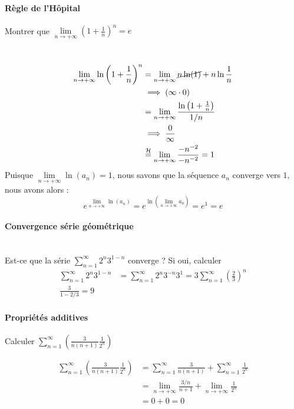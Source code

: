 \documentclass{report}
\begin{document}
\begin{multicols*}{2}
  \paragraph{Règle de l'Hôpital}
  Montrer que $\lim\limits_{n \to+\infty } (1 + \frac{1}{n})^n = e$ 

  \mbox{}\vspace{1em}\\

  \begin{align*}
    \lim\limits_{n \to+\infty } 
    \ln\left(1 + \frac{1}{n}\right)^n              
    &= 
    \lim\limits_{n \to+\infty }\cancel{n\ln(1)} + n\ln\frac{1}{n} \\ 
    &\implies (\infty \cdot 0) \\ 
    &= 
    \lim\limits_{n \to+\infty }\frac{\ln \left(1 + \frac{1}{n}\right)}{1/n} \\ 
    &\implies  \frac{0}{\infty } \\ 
    &\overset{\mathcal{H} }{=} 
    \lim\limits_{n \to+\infty } \frac{-n^{-2}}{-n^{-2}}  = 1 
  \end{align*}
  Puisque $\lim\limits_{n \to+\infty }\ln(a_n) = 1$, nous savons que
  la séquence $a_n$ converge vers $1$, nous avons alors :
  \[e^{\lim\limits_{n \to+\infty }\ln(a_n)} = 
  e^{\ln \left(\lim\limits_{n \to+\infty }a_n\right)} = e^1 = e \]
  \columnbreak

  \paragraph{Convergence série géométrique}
  \mbox{}\vspace{0.2em} \\
  Est-ce que la série $\sum_{n =1}^{\infty }2^n3^{1-n}$ 
  converge ? Si oui, calculer
  \begin{align*}
    \sum_{n =1}^{\infty }2^n3^{1-n} &=  
    \sum_{n=1}^{\infty }2^n3^{-n}3^1 = 3 \sum_{n=1}^{\infty } 
    \left(\frac{2}{3}\right)^n   \\ 
    \frac{3}{1 - 2/3} = 9 
  \end{align*}

  \paragraph{Propriétés additives}
  Calculer $\sum_{n=1}^{\infty }\left( \frac{3}{n(n+1)} 
  \frac{1}{2^n} \right)$

  \begin{align*}
   \sum_{n=1}^{\infty }\left( \frac{3}{n(n+1)} 
   \frac{1}{2^n} \right) 
   &= 
  \sum_{n=1}^{\infty }\frac{3}{n(n+1)} + 
  \sum_{n=1}^{\infty }\frac{1}{2^n} \\ 
   &= \lim\limits_{n \to+\infty } \frac{3/n}{n+1} + 
   \lim\limits_{n \to+\infty } \frac{1}{2^n}  \\
   &= 0 + 0 = 0  
  \end{align*}


\end{multicols*}
\end{document}
